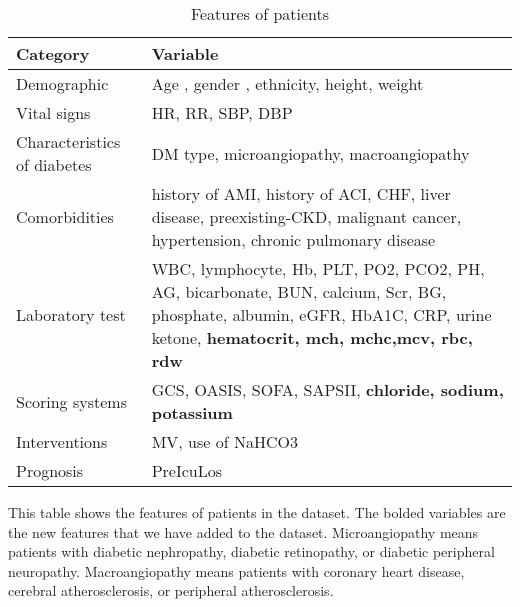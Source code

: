 \documentclass[../main.tex]{subfiles}
\begin{document}
\begin{table}
\centering
\caption{Features of patients}
\begin{tabular}{|l|p{}|}
    \hline
    \textbf{Category} & \textbf{Variable} \\
    \hline

    Demographic & 
    Age , gender , ethnicity, height, weight \\
    \hline

    Vital signs & 
    HR, RR, SBP, DBP \\
    \hline

    Characteristics of diabetes &
    DM type, microangiopathy, macroangiopathy \\
    \hline
    
    Comorbidities &
    history of AMI, history of ACI, CHF, liver disease, preexisting-CKD, malignant cancer, hypertension, chronic pulmonary disease \\
    \hline

    Laboratory test &
    WBC, lymphocyte, Hb, PLT, PO2, PCO2, PH, AG, bicarbonate, BUN, calcium, Scr, BG, phosphate, albumin, eGFR, HbA1C, CRP, urine ketone, \textbf{hematocrit, mch, mchc,mcv, rbc, rdw} \\
    \hline

    Scoring systems &
    GCS, OASIS, SOFA, SAPSII, \textbf{chloride, sodium, potassium} \\
    \hline

    Interventions &
    MV, use of NaHCO3 \\
    \hline

    Prognosis &
    PreIcuLos \\
    \hline

\end{tabular}

\end{table}

This table shows the features of patients in the dataset. 
The bolded variables are the new features that we have added to the dataset.
Microangiopathy means patients with diabetic nephropathy, diabetic retinopathy, or diabetic peripheral neuropathy. Macroangiopathy means patients with coronary heart disease, cerebral atherosclerosis, or peripheral atherosclerosis.
\end{document}
